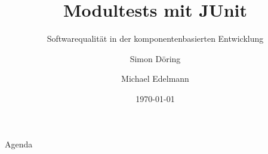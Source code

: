 \documentclass[utf8,t,aspectratio=169]{beamer}
\subtitle{\Large Softwarequalität in der komponentenbasierten Entwicklung}
\title{Modultests mit JUnit}
\author{Simon Döring \and Michael Edelmann}
\date{\today}
\begin{document}
	\titlegraphic {
	}
	\frame{\maketitle}

	\begin{frame}{Agenda}
		\tableofcontents
	\end{frame}
\end{document}
